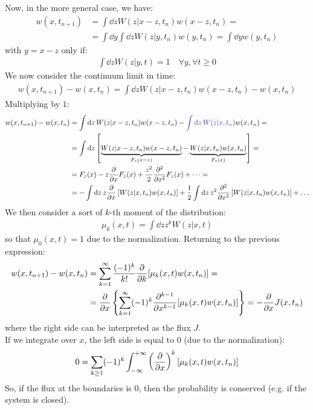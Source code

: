 \documentclass[../template.tex]{subfiles}
\begin{document}
Now, in the more general case, we have:
\begin{align*}
    w(x,t_{n+1}) &= \int \dd{z} W(z | x-z, t_n) w(x-z, t_n) = \\
    &= \int \dd{y} \int \dd{z} W(z|y,t_n) w(y, t_n) = \int \dd{y} w(y,t_n)
\end{align*}
with $y = x-z$ only if:
\begin{align*}
    \int \dd{z} W(z|y,t) = 1 \quad \forall y, \forall t \geq 0
\end{align*} 
We now consider the continuum limit in time:
\begin{align*}
    w(x,t_{n+1}) - w(x,t_n) = \int \dd{z} W(z| x-z, t_n) w(x-z, t_n) - w(x,t_n)
\end{align*}
Multiplying by $1$:
\begin{align*}
    w(x, t_{n+1} ) - w(x,t_n) &= \int \dd{z} W(z| x-z, t_n) w(x-z, t_n) - \textcolor{Blue}{\int \dd{z} W(z| x, t_n)} w(x,t_n) =\\
    &= \int \dd{z} \left[\underbrace{W(z| x-z,t_n) w(x-z, t_n) }_{F_z(x-z)} - \underbrace{W(z|x,t_n) w(x,t_n)}_{F_z(x)} \right] =\\
    &= F_z(x) - z \pdv{x} F_z(x) + \frac{z^2}{2} \pdv[2]{x} F_z(x) + \dots =\\
    &= -\int \dd{z} z \pdv{x} \left[W(z| x, t_n) w(x,t_n)\right] + \frac{1}{2} \int \dd{z} z^2 \pdv[2]{x} \left[W(z|x,t_n)w(x,t_n)\right] + \dots 
\end{align*}
We then consider a sort of $k$-th moment of the distribution: 
\begin{align*}
    \mu_k(x,t) = \int \dd{z} z^k W(z|x,t)
\end{align*}
so that $\mu_0(x,t) = 1$ due to the normalization. Returning to the previous expression:
\begin{align*}
    w(x,t_{n+1}) - w(x,t_n) &= \sum_{k=1}^\infty \frac{(-1)^k}{k!} \pdv{k}[\mu_k(x,t) w(x,t_n)] =\\
&= \pdv{x} \left\{
\sum_{k=1}^\infty  (-1)^k  \pdv[k-1]{x} [\mu_k(x,t) w(x,t_n)] 
\right\} = -\pdv{x}J(x,t_n) \\
\end{align*} 
where the right side can be interpreted as the flux $J$.\\ 
If we integrate over $x$, the left side is equal to $0$ (due to the normalization):
\begin{align*}
    0 = \sum_{k\geq 1} (-1)^k \int_{-\infty}^{+\infty} \left(\pdv{x}\right)^k [\mu_k(x,t) w(x,t_n)]
\end{align*}  
So, if the flux at the boundaries is $0$, then the probability is conserved (e.g. if the system is closed).
\end{document}
